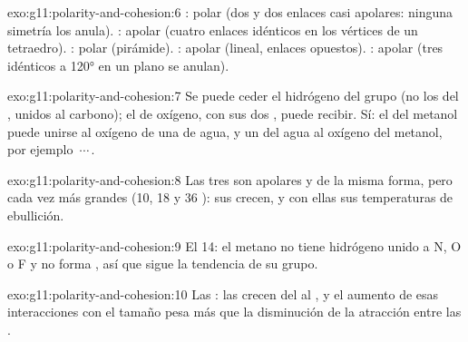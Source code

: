 \begin{solution}{exo:g11:polarity-and-cohesion:6}
: polar (dos   y dos enlaces
 casi apolares: ninguna simetría los anula). : apolar
(cuatro enlaces idénticos en los vértices de un tetraedro). :
polar (pirámide). : apolar (lineal, enlaces opuestos).
: apolar (tres  idénticos a \ang{120} en un plano
se anulan).
\end{solution}

\begin{solution}{exo:g11:polarity-and-cohesion:7}
Se puede ceder el hidrógeno del grupo  (no los del ,
unidos al carbono); el  de oxígeno, con sus dos , puede recibir. Sí: el  del metanol puede unirse al
oxígeno de una  de agua, y un  del agua al oxígeno del
metanol, por ejemplo \,$\cdots$\,.
\end{solution}

\begin{solution}{exo:g11:polarity-and-cohesion:8}
Las tres  son apolares y de la misma forma, pero cada vez más
grandes (10, 18 y 36 ): sus 
crecen, y con ellas sus temperaturas de ebullición.
\end{solution}

\begin{solution}{exo:g11:polarity-and-cohesion:9}
El  14: el metano no tiene hidrógeno unido a N, O o F y no forma
, así que sigue la tendencia de su grupo.
\end{solution}

\begin{solution}{exo:g11:polarity-and-cohesion:10}
Las : las  crecen del  al
, y el aumento de esas interacciones con el tamaño pesa más que
la disminución de la atracción entre las .
\end{solution}


